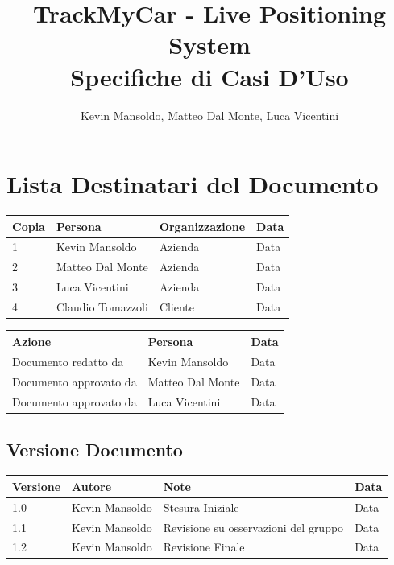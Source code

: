 \documentclass[a4paper,12pt]{article}
\begin{document}
\title{\textbf{TrackMyCar - Live Positioning System}\\Specifiche di Casi D'Uso}

\author{Kevin Mansoldo, Matteo Dal Monte, Luca Vicentini}
\date{}
\maketitle
\pagebreak

\tableofcontents
\pagebreak

\section{Lista Destinatari del Documento}

\begin{table}[ht]
\begin{center}
\begin{tabular}{p{1cm} p{4.5cm} p{5cm} p{2cm}}
\rowcolor{Ash}
\hline
Copia & Persona & Organizzazione & Data \\ \hline
1 & Kevin Mansoldo & Azienda & Data \\ 
2 & Matteo Dal Monte & Azienda & Data \\ 
3 & Luca Vicentini & Azienda & Data \\ 
4 & Claudio Tomazzoli & Cliente & Data \\ \hline
\end{tabular}
\end{center}


\begin{center}
\begin{tabular}{p{6cm} p{5cm} p{2cm}}
\rowcolor{Ash}
\hline
Azione & Persona & Data \\ \hline
Documento redatto da & Kevin Mansoldo & Data \\ 
Documento approvato da & Matteo Dal Monte & Data \\ 
Documento approvato da & Luca Vicentini & Data \\ \hline
\end{tabular}
\end{center}
\end{table}

\subsection{Versione Documento}
\begin{table}[ht]
\begin{center}
\begin{tabular}{p{1cm} p{4.5cm} p{5cm} p{2cm}}
\rowcolor{Ash}
\hline
Versione & Autore & Note & Data \\ \hline
1.0 & Kevin Mansoldo & Stesura Iniziale & Data \\ 
1.1 & Kevin Mansoldo & Revisione su osservazioni del gruppo & Data \\ 
1.2 & Kevin Mansoldo & Revisione Finale & Data \\ \hline
\end{tabular}
\end{center}
\end{table}
\end{document}
